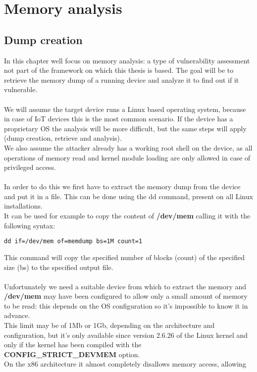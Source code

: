 \chapter{Memory analysis}
\section{Dump creation}
In this chapter well focus on memory analysis: a type of vulnerability assessment not part of the framework on which
this thesis is based. The goal will be to retrieve the memory dump of a running device
and analyze it to find out if it vulnerable.\\\\
We will assume the target device runs a Linux based operating system, because
in case of IoT devices this is the most common scenario. If the device has a
proprietary OS the analysis will be more difficult, but the same steps will apply
(dump creation, retrieve and analysis).\\
We also assume the attacker already has a working root shell on the device,
as all operations of memory read and kernel module loading are only allowed in
case of privileged access.\\\\
In order to do this we first have to extract the memory dump from the device
and put it in a file. This can be done using the dd command, present on all
Linux installations.\\ It can be used for example to copy the content of \textbf{/dev/mem}
calling it with the following syntax:
\begin{lstlisting}[numbers=none]
    dd if=/dev/mem of=memdump bs=1M count=1
\end{lstlisting}
This command will copy the specified number of blocks (count) of the specified
size (bs) to the specified output file.\\\\
Unfortunately we need a suitable device from which to extract the memory and \textbf{/dev/mem}
may have been configured to allow only a small amount of memory to be read:
this depends on the OS configuration so it's impossible to know it in advance.\\
This limit may be of 1Mb or 1Gb, depending on the architecture and configuration, but it's only
available since version 2.6.26 of the Linux kernel\cite{dev-mem-man} and only
if the kernel has been compiled with the \textbf{CONFIG\_STRICT\_DEVMEM} option.\\
On the x86 architecture it almost completely disallows memory access, allowing
